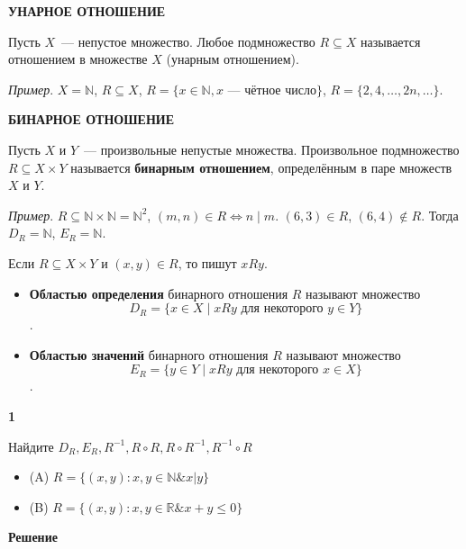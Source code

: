 \documentclass{article}
\begin{document}
\textbf{УНАРНОЕ ОТНОШЕНИЕ}

Пусть $X$~--- непустое множество. Любое подмножество $R \subseteq X$ называется отношением в множестве $X$ (унарным отношением).

\textit{Пример}. $X = \mathbb{N}$, $R \subseteq X$, $R = \{x \in \mathbb{N}, x\text{~--- чётное число}\}$, $R = \{2, 4, \ldots, 2n, \ldots\}$.

\textbf{БИНАРНОЕ ОТНОШЕНИЕ}


Пусть $X$ и $Y$~--- произвольные непустые множества. Произвольное подмножество $R \subseteq X \times Y$ называется \textbf{бинарным отношением}, определённым в паре множеств $X$ и $Y$.

\textit{Пример}. $R \subseteq \mathbb{N} \times \mathbb{N} = \mathbb{N}^2$, $(m, n) \in R \iff n \mid m$. $(6, 3) \in R$, $(6, 4) \notin R$. Тогда $D_R = \mathbb{N}$, $E_R = \mathbb{N}$.

Если $R \subseteq X \times Y$ и $(x, y) \in R$, то пишут $xRy$. 

\begin{itemize}
    \item \textbf{Областью определения} бинарного отношения $R$ называют множество $$D_R=\{x \in X \mid xRy \text{ для некоторого } y \in Y\}$$.
    \item \textbf{Областью значений} бинарного отношения $R$ называют множество $$E_R=\{y \in Y \mid xRy \text{ для некоторого } x \in X\}$$.
\end{itemize}

\textbf{1}

Найдите $D_R, E_R, R^{-1}, R \circ R, R \circ R^{-1}, R^{-1} \circ R$

\begin{itemize}
    \item (A) $R = \{(x, y): x, y \in \mathbb{N} \& x | y\}$
    \item (B) $R = \{(x, y): x, y \in \mathbb{R} \& x + y \le 0 \}$
    
\end{itemize}

\textbf{Решение}
\end{document}
